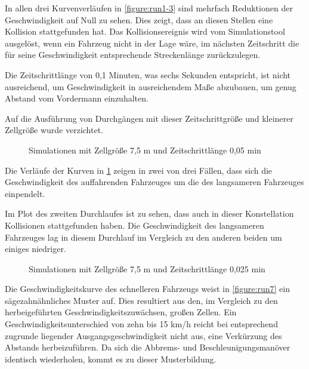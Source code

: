 In allen drei Kurvenverläufen in \cref{figure:run1-3} sind mehrfach Reduktionen der Geschwindigkeit auf Null zu sehen. 
Dies zeigt, dass an diesen Stellen eine Kollision stattgefunden hat. Das Kollisionsereignis wird vom Simulationstool ausgelöst, wenn ein Fahrzeug nicht in der Lage wäre, im nächsten Zeitschritt die für seine Geschwindigkeit entsprechende Streckenlänge zurückzulegen.

Die Zeitschrittlänge von 0,1 Minuten, was sechs Sekunden entspricht, ist nicht ausreichend, um Geschwindigkeit in ausreichendem Maße abzubauen, um genug Abstand vom Vordermann einzuhalten.

Auf die Ausführung von Durchgängen mit dieser Zeitschrittgröße und kleinerer Zellgröße wurde verzichtet.

\begin{figure}[hptb]
  \centering 
   \qquad 
   \qquad 
  \caption{Simulationen mit Zellgröße 7,5 m und Zeitschrittlänge 0,05 min} 
  \label{figure:run4-6}
\end{figure}

Die Verläufe der Kurven in \cref{figure:run4-6} zeigen in zwei von drei Fällen, dass sich die Geschwindigkeit des auffahrenden Fahrzeuges um die des langsameren Fahrzeuges einpendelt.

Im Plot des zweiten Durchlaufes ist zu sehen, dass auch in dieser Konstellation Kollisionen stattgefunden haben.
Die Geschwindigkeit des langsameren Fahrzeuges lag in diesem Durchlauf im Vergleich zu den anderen beiden um einiges niedriger.

\begin{figure}[hptb]
  \centering 
   \qquad 
   \qquad 
  \caption{Simulationen mit Zellgröße 7,5 m und Zeitschrittlänge 0,025 min} 
  \label{figure:run7-9}
\end{figure}

Die Geschwindigkeitskurve des schnelleren Fahrzeugs weist in \cref{figure:run7} ein sägezahnähnliches Muster auf.
Dies resultiert aus den, im Vergleich zu den herbeigeführten Geschwindigkeitszuwächsen, großen Zellen.
Ein Geschwindigkeitsunterschied von zehn bis 15 km/h reicht bei entsprechend zugrunde liegender Ausgangsgeschwindigkeit nicht aus, eine Verkürzung des Abstands herbeizuführen.
Da sich die Abbrems- und Beschleunigungsmanöver identisch wiederholen, kommt es zu dieser Musterbildung.


